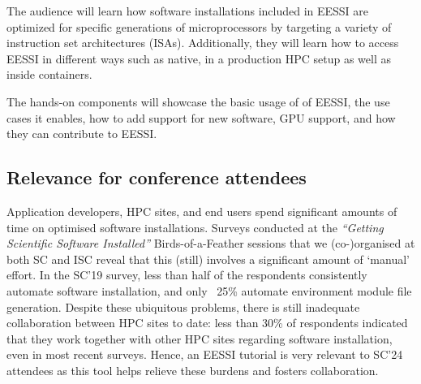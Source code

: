 The audience will learn how software installations included in EESSI are optimized for specific generations
of microprocessors by targeting a
variety of instruction set architectures (ISAs). Additionally, they will learn how to access EESSI in different ways such as native,
in a production HPC setup as well as inside containers.

The hands-on components will showcase the basic usage of of EESSI, the use cases it enables, how to add support for new software,
GPU support, and how they can contribute to EESSI.

\subsection*{Relevance for conference attendees}

Application developers, HPC sites, and end users %
spend significant amounts of time on optimised software installations. Surveys conducted at the
\emph{``Getting Scientific Software Installed''} Birds-of-a-Feather sessions that we (co-)organised at both SC and ISC
reveal that this (still) involves a significant amount of `manual' effort.
In the SC'19 survey,
less than half of the respondents consistently automate software installation,
and only ~25\% automate environment module file generation.
Despite these ubiquitous problems,
there is still inadequate collaboration
between HPC sites to date: less than 30\% of respondents indicated that they
work together with other HPC sites regarding software installation, even in most recent surveys.
Hence, an EESSI tutorial is very relevant to SC'24 attendees as this tool helps relieve these burdens and fosters
collaboration.

